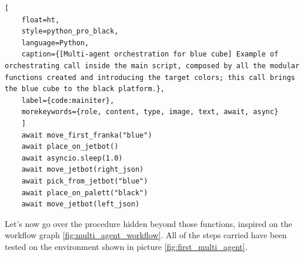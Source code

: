 \begin{lstlisting}[
	float=ht,
	style=python_pro_black,
	language=Python, 
	caption={[Multi-agent orchestration for blue cube] Example of orchestrating call inside the main script, composed by all the modular functions created and introducing the target colors; this call brings the blue cube to the black platform.}, 
	label={code:mainiter},
	morekeywords={role, content, type, image, text, await, async}
	]
	await move_first_franka("blue")
	await place_on_jetbot()
	await asyncio.sleep(1.0)
	await move_jetbot(right_json)
	await pick_from_jetbot("blue")
	await place_on_palett("black")
	await move_jetbot(left_json)
\end{lstlisting}

Let's now go over the procedure hidden beyond those functions, inspired on the workflow graph \ref{fig:multi_agent_workflow}. All of the steps carried have been tested on the environment shown in picture \ref{fig:first_multi_agent}.


